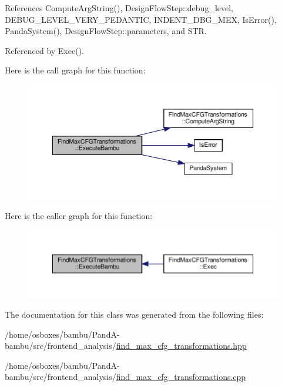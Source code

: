 References Compute\+Arg\+String(), Design\+Flow\+Step\+::debug\+\_\+level, D\+E\+B\+U\+G\+\_\+\+L\+E\+V\+E\+L\+\_\+\+V\+E\+R\+Y\+\_\+\+P\+E\+D\+A\+N\+T\+IC, I\+N\+D\+E\+N\+T\+\_\+\+D\+B\+G\+\_\+\+M\+EX, Is\+Error(), Panda\+System(), Design\+Flow\+Step\+::parameters, and S\+TR.



Referenced by Exec().

Here is the call graph for this function\+:
\nopagebreak
\begin{figure}[H]
\begin{center}
\leavevmode
\includegraphics[width=350pt]{d7/d5e/classFindMaxCFGTransformations_a57355680b93a3644f7c51a7a66bea078_cgraph}
\end{center}
\end{figure}
Here is the caller graph for this function\+:
\nopagebreak
\begin{figure}[H]
\begin{center}
\leavevmode
\includegraphics[width=350pt]{d7/d5e/classFindMaxCFGTransformations_a57355680b93a3644f7c51a7a66bea078_icgraph}
\end{center}
\end{figure}


The documentation for this class was generated from the following files\+:\begin{DoxyCompactItemize}
\item 
/home/osboxes/bambu/\+Pand\+A-\/bambu/src/frontend\+\_\+analysis/\hyperlink{find__max__cfg__transformations_8hpp}{find\+\_\+max\+\_\+cfg\+\_\+transformations.\+hpp}\item 
/home/osboxes/bambu/\+Pand\+A-\/bambu/src/frontend\+\_\+analysis/\hyperlink{find__max__cfg__transformations_8cpp}{find\+\_\+max\+\_\+cfg\+\_\+transformations.\+cpp}\end{DoxyCompactItemize}
